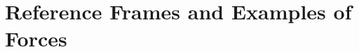 \documentclass[british,11pt,a4paper]{report}
\begin{document}
\maketitle
\tableofcontents
\chapter{Reference Frames and Examples of Forces}

\end{document}
